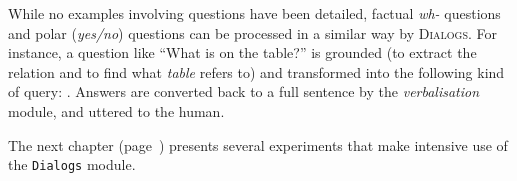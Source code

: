  
While no examples involving questions have been detailed, factual \emph{wh-}
questions and polar (\emph{yes/no}) questions can be processed in a similar way
by \textsc{Dialogs}. For instance, a question like ``What is on the table?'' is
grounded (to extract the relation  and to find what \emph{table}
refers to) and transformed into the following kind of query: .  Answers are converted back to a full sentence by
the \emph{verbalisation} module, and uttered to the human.


The next chapter (page~\pageref{chapter|evaluation}) presents several
experiments that make intensive use of the {\tt Dialogs} module.

